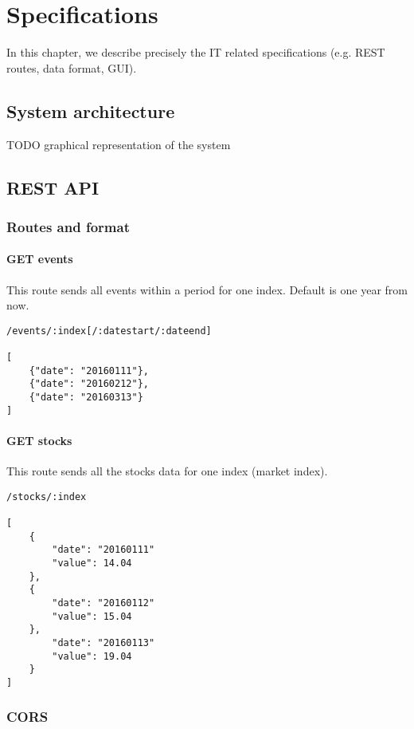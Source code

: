 \chapter{Specifications}
\label{chapter:specifications}
In this chapter, we describe precisely the IT related specifications (e.g. REST routes, data format, GUI).

\section{System architecture}
TODO graphical representation of the system

\section{REST API}

\subsection{Routes and format}

\subsubsection*{GET events}
This route sends all events within a period for one index. Default is one year from now.
\begin{verbatim}
/events/:index[/:datestart/:dateend]

[
    {"date": "20160111"},
    {"date": "20160212"},
    {"date": "20160313"}
]
\end{verbatim}
\subsubsection*{GET stocks}
This route sends all the stocks data for one index (market index).
\begin{verbatim}
/stocks/:index

[
    {
        "date": "20160111"
        "value": 14.04
    },
    {
        "date": "20160112"
        "value": 15.04
    },
        "date": "20160113"
        "value": 19.04
    }
]
\end{verbatim}

\subsection{CORS}
